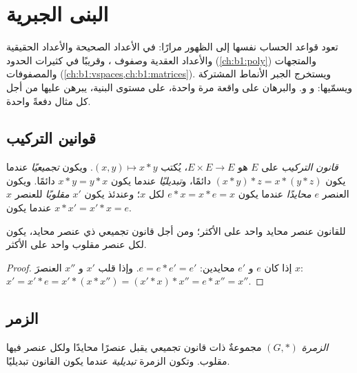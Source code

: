 \chapter{البنى الجبرية}\label{ch:b1:structures}

تعود قواعد الحساب نفسها إلى الظهور مرارًا: في الأعداد الصحيحة والأعداد
الحقيقية والأعداد العقدية وصفوف ، وقريبًا في كثيرات الحدود
(\cref{ch:b1:poly}) والمتجهات والمصفوفات
(\cref{ch:b1:vspaces,ch:b1:matrices}). ويستخرج الجبر الأنماط
المشتركة ويسمّيها: \emph{} و\emph{} و\emph{}.
والبرهان على واقعة مرة واحدة، على مستوى البنية، يبرهن عليها من أجل
كل مثال دفعةً واحدة.

\section{قوانين التركيب}

\begin{definition}\label{def:b1:structures:law}
\emph{قانون التركيب} على  $E$ هو
 $E \times E \to E$، يُكتب $(x, y) \mapsto x * y$. ويكون
\emph{تجميعيًا} عندما يكون $(x*y)*z = x*(y*z)$ دائمًا، و\emph{تبديليًا}
عندما يكون $x * y = y * x$ دائمًا. ويكون العنصر $e$ \emph{محايدًا} عندما يكون
$e * x = x * e = x$ لكل $x$؛ وعندئذ يكون $x'$ \emph{مقلوبًا} للعنصر $x$
عندما يكون $x * x' = x' * x = e$.
\end{definition}

\begin{proposition}[الوحدانية]\label{prop:b1:structures:unique}
للقانون عنصر محايد واحد على الأكثر؛ ومن أجل قانون تجميعي ذي عنصر محايد،
يكون لكل عنصر مقلوب واحد على الأكثر.
\end{proposition}

\begin{proof}
إذا كان $e$ و $e'$ محايدين: $e = e * e' = e'$. وإذا قلب $x'$ و $x''$
العنصرَ $x$: $x' = x' * e = x' * (x * x'') = (x' * x) * x'' = e * x''
= x''$.
\end{proof}

\section{الزمر}

\begin{definition}[الزمرة]\label{def:b1:structures:group}
\emph{الزمرة} $(G, *)$ مجموعةٌ ذات قانون تجميعي
يقبل عنصرًا محايدًا ولكل عنصر فيها مقلوب. وتكون
الزمرة \emph{تبديلية} عندما يكون القانون
تبديليًا.
\end{definition}

